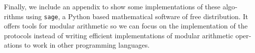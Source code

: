 \begin{otherlanguage}{english}


Finally, we include an appendix to show some implementations of these algorithms using \texttt{sage}, a Python based mathematical software of free distribution. It offers tools for modular arithmetic so we can focus on the implementation of the protocols instead of writing efficient implementations of modular arithmetic operations to work in other programming languages.






\end{otherlanguage}

\endgroup			

\vfill